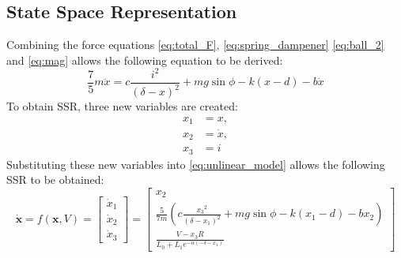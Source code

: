 \documentclass[a4paper,10pt,reqno]{amsart}
\numberwithin{equation}{section}
\begin{document}
\subsection{State Space Representation}
Combining the force equations \eqref{eq:total_F}, \eqref{eq:spring_dampener} \eqref{eq:ball_2} and \eqref{eq:mag} allows the following equation to be derived:
\begin{equation}
\label{eq:unlinear_model}
    \frac{7}{5}m\ddot x=c\frac{i^2}{(\delta-x)^2}+mg\sin{\phi}-k(x-d)-b\dot x
\end{equation}
To obtain SSR, three new variables are created:
\begin{align*}
x_1&=x, \\
x_2&=\dot x, \\
x_3&=i
\end{align*}
Substituting these new variables into \eqref{eq:unlinear_model} allows the following SSR to be obtained:
\begin{equation}
\label{eq:SSR}
    \mathbf{\dot x} = f(\mathbf x, V) = \begin{bmatrix} 
        \dot x_1 \\ 
        \dot x_2 \\ 
        \dot x_3 
    \end{bmatrix} = \begin{bmatrix}
        x_2 \\
        \frac{5}{7m}(c\frac{{x_3}^2}{(\delta-x_1)^2}+mg\sin{\phi}-k(x_1-d)-bx_2) \\
        \frac{V-x_3R}{L_0+L_1e^{-\alpha(-\delta-x_1)}}
    \end{bmatrix}
\end{equation}
\end{document}

